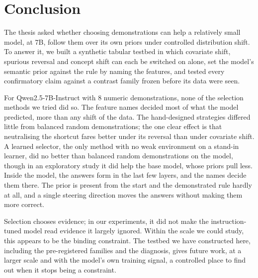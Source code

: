 \chapter{Conclusion}
\label{ch:conclusion}

The thesis asked whether choosing demonstrations can help a relatively small model, at 7B, follow them over its own priors under controlled distribution shift. To answer it, we built a synthetic tabular testbed in which covariate shift, spurious reversal and concept shift can each be switched on alone, set the model's semantic prior against the rule by naming the features, and tested every confirmatory claim against a contrast family frozen before its data were seen.

For Qwen2.5-7B-Instruct with 8 numeric demonstrations, none of the selection methods we tried did so. The feature names decided most of what the model predicted, more than any shift of the data. The hand-designed strategies differed little from balanced random demonstrations; the one clear effect is that neutralising the shortcut fares better under its reversal than under covariate shift. A learned selector, the only method with no weak environment on a stand-in learner, did no better than balanced random demonstrations on the model, though in an exploratory study it did help the base model, whose priors pull less. Inside the model, the answers form in the last few layers, and the names decide them there. The prior is present from the start and the demonstrated rule hardly at all, and a single steering direction moves the answers without making them more correct.

Selection chooses evidence; in our experiments, it did not make the instruction-tuned model read evidence it largely ignored. Within the scale we could study, this appears to be the binding constraint. The testbed we have constructed here, including the pre-registered families and the diagnosis, gives future work, at a larger scale and with the model's own training signal, a controlled place to find out when it stops being a constraint.
